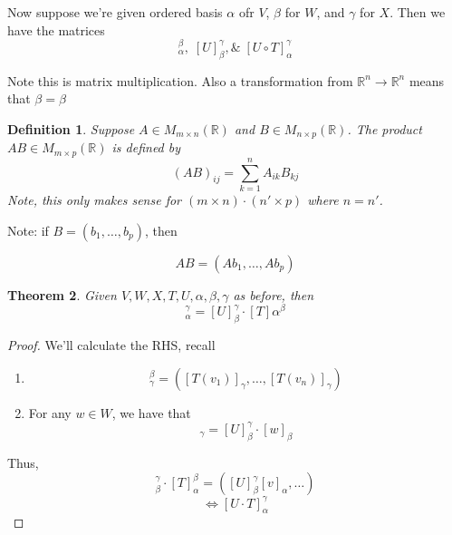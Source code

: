 \documentclass{article}
\newtheorem{theorem}{Theorem}[section]
\newtheorem{definition}[theorem]{Definition}
\newtheorem{one minute paper}[theorem]{One Minute Paper}
\begin{document}
Now suppose we're given ordered basis $\alpha$ ofr $V$, $\beta$ for $W$, and $\gamma$ for $X$. Then we have the matrices
\begin{equation}
    [T]_\alpha^\beta,  \; [U]_\beta^\gamma, \& \; [U \circ T]_\alpha^\gamma
\end{equation}

Note this is matrix multiplication. Also a transformation from $\mathbb{R}^n \rightarrow \mathbb{R}^n$ means that $\beta = \beta$

\begin{definition}
    Suppose $A \in M_{m \times n}(\mathbb{R})$ and $B \in M_{n\times p}(\mathbb{R})$. The product $AB \in M_{m \times p}(\mathbb{R})$
    is defined by 
    \begin{equation}
        (AB)_{ij} = \sum_{k=1}^{n}A_{ik}B_{kj}
    \end{equation}
    Note, this only makes sense for $(m \times n) \cdot (n' \times p)$ where $n = n'$. 
\end{definition}

Note: if $B = \left(b_1, \dots, b_p\right)$, then 

\begin{equation}
    AB = (Ab_1, \dots, Ab_p)
\end{equation}

\begin{theorem}
    Given $V,W,X,T,U,\alpha,\beta,\gamma$ as before, then 
    \begin{equation}
        [U \cdot T]_\alpha^\gamma = [U]_\beta^\gamma \cdot [T]\alpha^\beta
    \end{equation}
\end{theorem}

\begin{proof}
    We'll calculate the RHS, recall 
    \begin{enumerate}
        \item \begin{equation}
            [T]_\gamma^\beta = \left([T(v_1)]_\gamma, \dots, [T(v_n)]_\gamma\right)
        \end{equation}
        \item For any $w \in W$, we have that 
        \begin{equation}
            [U(w)]_\gamma = [U]_\beta^\gamma \cdot [w]_\beta 
        \end{equation}
    \end{enumerate}
    Thus,
    \begin{equation}
        [U]_\beta^\gamma \cdot [T]_\alpha^\beta = \left([U]_\beta^\gamma [v]_\alpha, \dots\right)
    \end{equation}
    \begin{equation}
        \iff [U \cdot T]_\alpha^\gamma
    \end{equation}
\end{proof}
\end{document}

